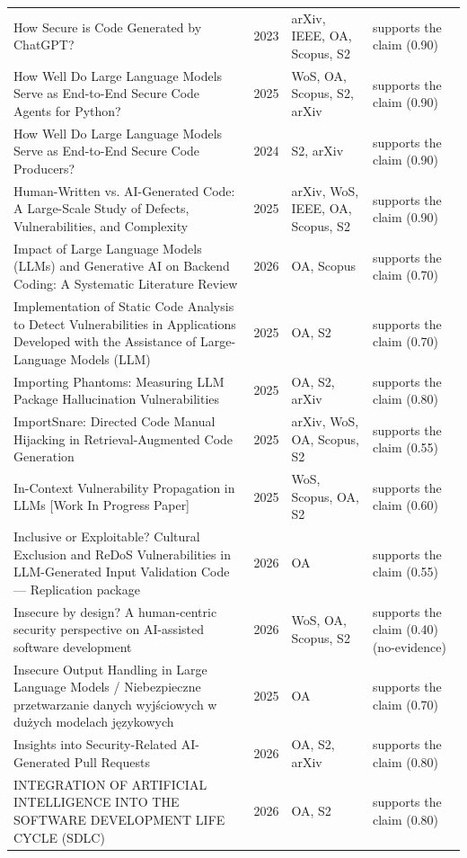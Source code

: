 \begin{longtable}{@{}%
  >{\raggedright\arraybackslash}p{}c%
  >{\raggedright\arraybackslash}p{}%
  >{\raggedright\arraybackslash}p{}@{}}
How Secure is Code Generated by ChatGPT? & 2023 & arXiv, IEEE, OA, Scopus, S2 & supports the claim (0.90) \\
How Well Do Large Language Models Serve as End-to-End Secure Code Agents for Python? & 2025 & WoS, OA, Scopus, S2, arXiv & supports the claim (0.90) \\
How Well Do Large Language Models Serve as End-to-End Secure Code Producers? & 2024 & S2, arXiv & supports the claim (0.90) \\
Human-Written vs. AI-Generated Code: A Large-Scale Study of Defects, Vulnerabilities, and Complexity & 2025 & arXiv, WoS, IEEE, OA, Scopus, S2 & supports the claim (0.90) \\
Impact of Large Language Models (LLMs) and Generative AI on Backend Coding: A Systematic Literature Review & 2026 & OA, Scopus & supports the claim (0.70) \\
Implementation of Static Code Analysis to Detect Vulnerabilities in Applications Developed with the Assistance of Large-Language Models (LLM) & 2025 & OA, S2 & supports the claim (0.70) \\
Importing Phantoms: Measuring LLM Package Hallucination Vulnerabilities & 2025 & OA, S2, arXiv & supports the claim (0.80) \\
ImportSnare: Directed \textquotedbl{}Code Manual\textquotedbl{} Hijacking in Retrieval-Augmented Code Generation & 2025 & arXiv, WoS, OA, Scopus, S2 & supports the claim (0.55) \\
In-Context Vulnerability Propagation in LLMs [Work In Progress Paper] & 2025 & WoS, Scopus, OA, S2 & supports the claim (0.60) \\
Inclusive or Exploitable? Cultural Exclusion and ReDoS Vulnerabilities in LLM-Generated Input Validation Code --- Replication package & 2026 & OA & supports the claim (0.55) \\
Insecure by design? A human-centric security perspective on AI-assisted software development & 2026 & WoS, OA, Scopus, S2 & supports the claim (0.40) (no-evidence) \\
Insecure Output Handling in Large Language Models / Niebezpieczne przetwarzanie danych wyjściowych w dużych modelach językowych & 2025 & OA & supports the claim (0.70) \\
Insights into Security-Related AI-Generated Pull Requests & 2026 & OA, S2, arXiv & supports the claim (0.80) \\
INTEGRATION OF ARTIFICIAL INTELLIGENCE INTO THE SOFTWARE DEVELOPMENT LIFE CYCLE (SDLC) & 2026 & OA, S2 & supports the claim (0.80) \\

\end{longtable}
